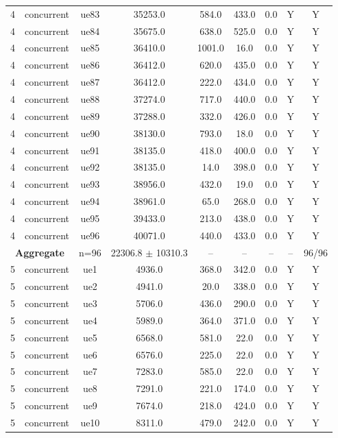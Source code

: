 \begin{table}[ht]
\begin{tabular}{|c|c|c|c|c|c|c|c|c|}
4 & concurrent & ue83 & 35253.0 & 584.0 & 433.0 & 0.0 & Y & Y \\
4 & concurrent & ue84 & 35675.0 & 638.0 & 525.0 & 0.0 & Y & Y \\
4 & concurrent & ue85 & 36410.0 & 1001.0 & 16.0 & 0.0 & Y & Y \\
4 & concurrent & ue86 & 36412.0 & 620.0 & 435.0 & 0.0 & Y & Y \\
4 & concurrent & ue87 & 36412.0 & 222.0 & 434.0 & 0.0 & Y & Y \\
4 & concurrent & ue88 & 37274.0 & 717.0 & 440.0 & 0.0 & Y & Y \\
4 & concurrent & ue89 & 37288.0 & 332.0 & 426.0 & 0.0 & Y & Y \\
4 & concurrent & ue90 & 38130.0 & 793.0 & 18.0 & 0.0 & Y & Y \\
4 & concurrent & ue91 & 38135.0 & 418.0 & 400.0 & 0.0 & Y & Y \\
4 & concurrent & ue92 & 38135.0 & 14.0 & 398.0 & 0.0 & Y & Y \\
4 & concurrent & ue93 & 38956.0 & 432.0 & 19.0 & 0.0 & Y & Y \\
4 & concurrent & ue94 & 38961.0 & 65.0 & 268.0 & 0.0 & Y & Y \\
4 & concurrent & ue95 & 39433.0 & 213.0 & 438.0 & 0.0 & Y & Y \\
4 & concurrent & ue96 & 40071.0 & 440.0 & 433.0 & 0.0 & Y & Y \\
\multicolumn{2}{|c|}{\textbf{Aggregate}} & n=96 & 22306.8 $\pm$ 10310.3 & -- & -- & -- & -- & 96/96 \\
\hline
5 & concurrent & ue1 & 4936.0 & 368.0 & 342.0 & 0.0 & Y & Y \\
5 & concurrent & ue2 & 4941.0 & 20.0 & 338.0 & 0.0 & Y & Y \\
5 & concurrent & ue3 & 5706.0 & 436.0 & 290.0 & 0.0 & Y & Y \\
5 & concurrent & ue4 & 5989.0 & 364.0 & 371.0 & 0.0 & Y & Y \\
5 & concurrent & ue5 & 6568.0 & 581.0 & 22.0 & 0.0 & Y & Y \\
5 & concurrent & ue6 & 6576.0 & 225.0 & 22.0 & 0.0 & Y & Y \\
5 & concurrent & ue7 & 7283.0 & 585.0 & 22.0 & 0.0 & Y & Y \\
5 & concurrent & ue8 & 7291.0 & 221.0 & 174.0 & 0.0 & Y & Y \\
5 & concurrent & ue9 & 7674.0 & 218.0 & 424.0 & 0.0 & Y & Y \\
5 & concurrent & ue10 & 8311.0 & 479.0 & 242.0 & 0.0 & Y & Y \\

\end{tabular}
\end{table}
